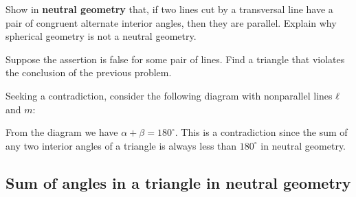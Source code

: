 \documentclass[instructornotes]{ximera}
\begin{document}
\begin{problem}\label{ng_parallel}
Show in \textbf{neutral geometry} that, if two lines cut by a
transversal line have a pair of congruent alternate interior angles,
then they are parallel. Explain why spherical geometry is not a
neutral geometry.

\begin{hint}
Suppose the assertion is false for some pair of lines. Find a triangle
that violates the conclusion of the previous problem.
\end{hint}
\begin{freeResponse}
Seeking a contradiction, consider the following diagram with
nonparallel lines $\ell$ and $m$:
\begin{image}
\end{image}
From the diagram we have $\alpha + \beta = 180^\circ$. This is a
contradiction since the sum of any two interior angles of a triangle
is always less than $180^\circ$ in neutral geometry.
\end{freeResponse}

\end{problem}







\subsection{Sum of angles in a triangle in neutral geometry}
\end{document}
